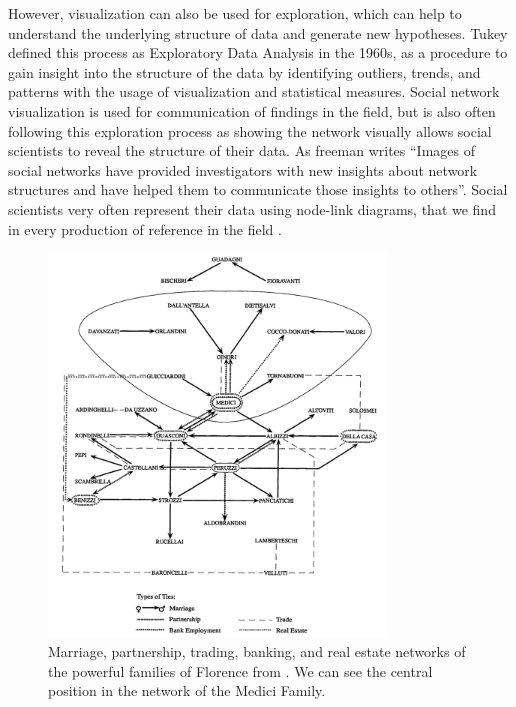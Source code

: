 However, visualization can also be used for exploration, which can help to understand the underlying structure of data and generate new hypotheses.
Tukey defined this process as Exploratory Data Analysis in the 1960s\cite{tukeyExploratoryDataAnalysis1977}, as a procedure to gain insight into the structure of the data by identifying outliers, trends, and patterns with the usage of visualization and statistical measures.
Social network visualization is used for communication of findings in the field, but is also often following this exploration process as showing the network visually allows social scientists to reveal the structure of their data.
As freeman writes ``Images of social networks have provided investigators with new insights about network structures and have helped them to communicate those insights to others''\cite{freemanVisualizingSocialNetworks2000}.
Social scientists very often represent their data using node-link diagrams, that we find in every production of reference in the field \cite{wassermanSocialNetworkAnalysis1994, tabassumSocialNetworkAnalysis2018, lazegaReseaux, brandesNetworkAnalysisMethodological2005}.

\begin{figure}[!ht]
    \centering %
    \includegraphics[width=0.8\textwidth]{static/figures/RelatedWork/padgett-Medicis.png}
    \caption{Marriage, partnership, trading, banking, and real estate networks of the powerful families of Florence from \cite{padgettRobustActionRise1993}. We can see the central position in the network of the Medici Family.}
    \label{fig:padgett-medicis}
\end{figure}

